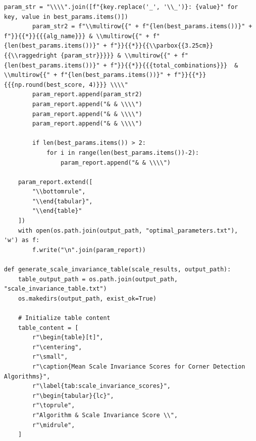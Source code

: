 \documentclass[journal]{IEEEtran}
\begin{document}
\begin{lstlisting}[style=python, caption={Utility Functions for Data Processing}, label={lst:utilities}]
        param_str = "\\\\".join([f"{key.replace('_', '\\_')}: {value}" for key, value in best_params.items()])
        param_str2 = f"\\multirow{{" + f"{len(best_params.items())}" + f"}}{{*}}{{{alg_name}}} & \\multirow{{" + f"{len(best_params.items())}" + f"}}{{*}}{{\\parbox{{3.25cm}}{{\\raggedright {param_str}}}}} & \\multirow{{" + f"{len(best_params.items())}" + f"}}{{*}}{{{total_combinations}}}  & \\multirow{{" + f"{len(best_params.items())}" + f"}}{{*}}{{{np.round(best_score, 4)}}} \\\\"
        param_report.append(param_str2)
        param_report.append("& & \\\\")
        param_report.append("& & \\\\")
        param_report.append("& & \\\\")
        
        if len(best_params.items()) > 2:
            for i in range(len(best_params.items())-2):
                param_report.append("& & \\\\")
                    
    param_report.extend([
        "\\bottomrule",
        "\\end{tabular}",
        "\\end{table}"
    ]) 
    with open(os.path.join(output_path, "optimal_parameters.txt"), 'w') as f:
        f.write("\n".join(param_report))
        
def generate_scale_invariance_table(scale_results, output_path):
    table_output_path = os.path.join(output_path, "scale_invariance_table.txt")
    os.makedirs(output_path, exist_ok=True)
    
    # Initialize table content
    table_content = [
        r"\begin{table}[t]",
        r"\centering",
        r"\small",
        r"\caption{Mean Scale Invariance Scores for Corner Detection Algorithms}",
        r"\label{tab:scale_invariance_scores}",
        r"\begin{tabular}{lc}",
        r"\toprule",
        r"Algorithm & Scale Invariance Score \\",
        r"\midrule",
    ]
    

\end{lstlisting}
\end{document}
